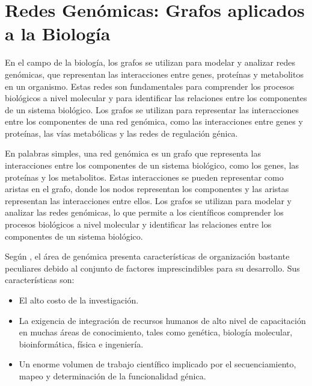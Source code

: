 \documentclass[11pt, a4paper]{article}
\begin{document}
  \newpage

  \section{Redes Genómicas: Grafos aplicados a la Biología}

  En el campo de la biología, los grafos se utilizan para modelar y analizar redes genómicas, que representan las interacciones entre genes, proteínas y metabolitos en un organismo. Estas redes son fundamentales para comprender los procesos biológicos a nivel molecular y para identificar las relaciones entre los componentes de un sistema biológico. Los grafos se utilizan para representar las interacciones entre los componentes de una red genómica, como las interacciones entre genes y proteínas, las vías metabólicas y las redes de regulación génica.

  En palabras simples, una red genómica es un grafo que representa las interacciones entre los componentes de un sistema biológico, como los genes, las proteínas y los metabolitos. Estas interacciones se pueden representar como aristas en el grafo, donde los nodos representan los componentes y las aristas representan las interacciones entre ellos. Los grafos se utilizan para modelar y analizar las redes genómicas, lo que permite a los científicos comprender los procesos biológicos a nivel molecular y identificar las relaciones entre los componentes de un sistema biológico.

  Según \cite{dal2001red}, el área de genómica presenta características de organización bastante peculiares debido al conjunto de factores imprescindibles para su desarrollo. Sus características son:

  \begin{itemize}
    \item El alto costo de la investigación.
    \item La exigencia de integración de recursos humanos de alto nivel de capacitación en muchas áreas de conocimiento, tales como genética, biología molecular, bioinformática, física e ingeniería.
    \item Un enorme volumen de trabajo científico implicado por el secuenciamiento, mapeo y determinación de la funcionalidad génica.
  \end{itemize}

  \begin{flushright}
    \textit{\cite{dal2001red}}
  \end{flushright}
\end{document}

